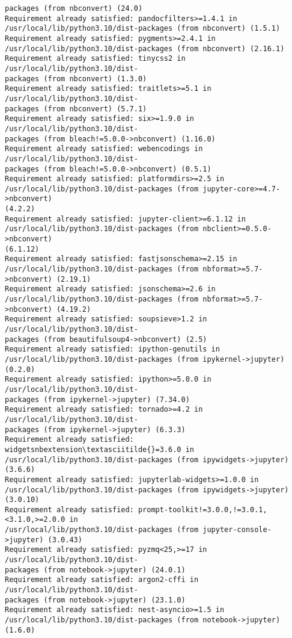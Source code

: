 \documentclass[11pt]{article}
\begin{document}
\begin{Verbatim}[commandchars=\\\{\}]
packages (from nbconvert) (24.0)
Requirement already satisfied: pandocfilters>=1.4.1 in
/usr/local/lib/python3.10/dist-packages (from nbconvert) (1.5.1)
Requirement already satisfied: pygments>=2.4.1 in
/usr/local/lib/python3.10/dist-packages (from nbconvert) (2.16.1)
Requirement already satisfied: tinycss2 in /usr/local/lib/python3.10/dist-
packages (from nbconvert) (1.3.0)
Requirement already satisfied: traitlets>=5.1 in /usr/local/lib/python3.10/dist-
packages (from nbconvert) (5.7.1)
Requirement already satisfied: six>=1.9.0 in /usr/local/lib/python3.10/dist-
packages (from bleach!=5.0.0->nbconvert) (1.16.0)
Requirement already satisfied: webencodings in /usr/local/lib/python3.10/dist-
packages (from bleach!=5.0.0->nbconvert) (0.5.1)
Requirement already satisfied: platformdirs>=2.5 in
/usr/local/lib/python3.10/dist-packages (from jupyter-core>=4.7->nbconvert)
(4.2.2)
Requirement already satisfied: jupyter-client>=6.1.12 in
/usr/local/lib/python3.10/dist-packages (from nbclient>=0.5.0->nbconvert)
(6.1.12)
Requirement already satisfied: fastjsonschema>=2.15 in
/usr/local/lib/python3.10/dist-packages (from nbformat>=5.7->nbconvert) (2.19.1)
Requirement already satisfied: jsonschema>=2.6 in
/usr/local/lib/python3.10/dist-packages (from nbformat>=5.7->nbconvert) (4.19.2)
Requirement already satisfied: soupsieve>1.2 in /usr/local/lib/python3.10/dist-
packages (from beautifulsoup4->nbconvert) (2.5)
Requirement already satisfied: ipython-genutils in
/usr/local/lib/python3.10/dist-packages (from ipykernel->jupyter) (0.2.0)
Requirement already satisfied: ipython>=5.0.0 in /usr/local/lib/python3.10/dist-
packages (from ipykernel->jupyter) (7.34.0)
Requirement already satisfied: tornado>=4.2 in /usr/local/lib/python3.10/dist-
packages (from ipykernel->jupyter) (6.3.3)
Requirement already satisfied: widgetsnbextension\textasciitilde{}=3.6.0 in
/usr/local/lib/python3.10/dist-packages (from ipywidgets->jupyter) (3.6.6)
Requirement already satisfied: jupyterlab-widgets>=1.0.0 in
/usr/local/lib/python3.10/dist-packages (from ipywidgets->jupyter) (3.0.10)
Requirement already satisfied: prompt-toolkit!=3.0.0,!=3.0.1,<3.1.0,>=2.0.0 in
/usr/local/lib/python3.10/dist-packages (from jupyter-console->jupyter) (3.0.43)
Requirement already satisfied: pyzmq<25,>=17 in /usr/local/lib/python3.10/dist-
packages (from notebook->jupyter) (24.0.1)
Requirement already satisfied: argon2-cffi in /usr/local/lib/python3.10/dist-
packages (from notebook->jupyter) (23.1.0)
Requirement already satisfied: nest-asyncio>=1.5 in
/usr/local/lib/python3.10/dist-packages (from notebook->jupyter) (1.6.0)

\end{Verbatim}
\end{document}
